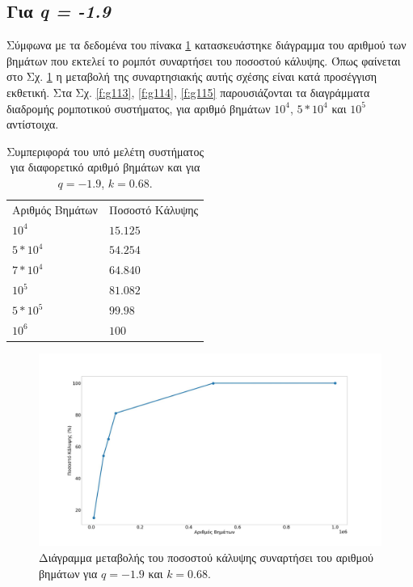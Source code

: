 \clearpage

\subsection{Για \emph{q = -1.9}}

Σύμφωνα με τα δεδομένα του πίνακα \ref{tab:abc15} κατασκευάστηκε διάγραμμα του αριθμού των βημάτων που εκτελεί το ρομπότ συναρτήσει του ποσοστού κάλυψης. Όπως φαίνεται στο Σχ. \ref{f:g112} η μεταβολή της συναρτησιακής αυτής σχέσης είναι κατά προσέγγιση εκθετική. Στα Σχ. \ref{f:g113}, \ref{f:g114}, \ref{f:g115} παρουσιάζονται τα διαγράμματα διαδρομής ρομποτικού συστήματος, για αριθμό βημάτων $10^4$, $5*10^4$ και $10^5$ αντίστοιχα.

\begin{table}[ht]
	\centering
	\caption{Συμπεριφορά του υπό μελέτη συστήματος για διαφορετικό αριθμό βημάτων και για $q = -1.9$, $k = 0.68$.}
	\begin{tabular}{l | l }
		Αριθμός Βημάτων & Ποσοστό Κάλυψης \\
		
		$10^4$ &  $15.125$ \\
		$5*10^4$ & $54.254$\\
		$7*10^4$&  $64.840$ \\
		$10^5$ & $81.082$\\
		$5*10^5$& $99.98$\\
		$10^6$& $100$\\
		
	\end{tabular}	
	\label{tab:abc15}
\end{table}

\begin{figure}[ht]
	\centering
	\includegraphics[width=1\linewidth]{LateX images/log/steps/g2}
	\caption{Διάγραμμα μεταβολής του ποσοστού κάλυψης συναρτήσει του αριθμού βημάτων για $q = -1.9$ και $k= 0.68$.}
	\label{f:g112}	
\end{figure}

